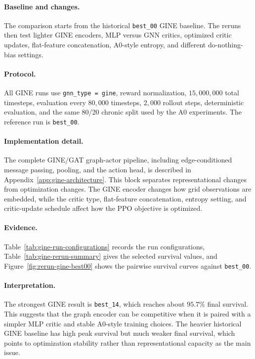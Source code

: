\paragraph{Baseline and changes.}
The comparison starts from the historical \texttt{best\_00} GINE baseline. The
reruns then test lighter GINE encoders, MLP versus GNN critics, optimized critic
updates, flat-feature concatenation, A0-style entropy, and different
do-nothing-bias settings.

\paragraph{Protocol.}
All GINE runs use \texttt{gnn\_type = gine}, reward normalization,
\(15{,}000{,}000\) total timesteps, evaluation every \(80{,}000\) timesteps,
\(2{,}000\) rollout steps, deterministic evaluation, and the same 80/20 chronic
split used by the A0 experiments. The reference run is \texttt{best\_00}.

\paragraph{Implementation detail.}
The complete GINE/GAT graph-actor pipeline, including edge-conditioned message
passing, pooling, and the action head, is described in
Appendix~\ref{app:gine-architecture}. This block separates representational
changes from optimization changes. The GINE encoder changes how grid
observations are embedded, while the critic type, flat-feature concatenation,
entropy setting, and critic-update schedule affect how the PPO objective is
optimized.

\paragraph{Evidence.}
Table~\ref{tab:gine-run-configurations} records the run configurations,
Table~\ref{tab:gine-rerun-summary} gives the selected survival values, and
Figure~\ref{fig:rerun-gine-best00} shows the pairwise survival curves against
\texttt{best\_00}.

\paragraph{Interpretation.}
The strongest GINE result is \texttt{best\_14}, which reaches about
\(95.7\%\) final survival. This suggests that the graph encoder can be
competitive when it is paired with a simpler MLP critic and stable A0-style
training choices. The heavier historical GINE baseline has high peak survival
but much weaker final survival, which points to optimization stability rather
than representational capacity as the main issue.

